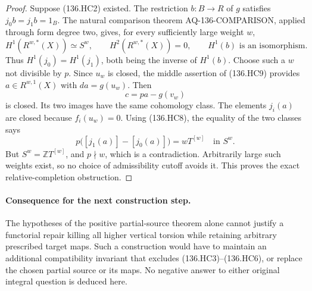 \begin{proof}
Suppose (136.HC2) existed. The restriction $b:B\to R$ of
$g$ satisfies $j_0b=j_1b=1_B$. The natural comparison theorem
AQ-136-COMPARISON, applied through form degree two, gives,
for every sufficiently large weight $w$,
\[
 H^1(R^{w,*}(X))\simeq S^w,\qquad
 H^2(R^{w,*}(X))=0,\qquad
 H^1(b)\text{ is an isomorphism}.                         \tag{136.HC9}
\]
Thus $H^1(j_0)=H^1(j_1)$, both being the inverse of $H^1(b)$.
Choose such a $w$ not divisible by $p$. Since $u_w$ is
closed, the middle assertion of (136.HC9) provides
$a\in R^{w,1}(X)$ with $da=g(u_w)$. Then
\[
                           c=pa-g(v_w)
\]
is closed. Its two images have the same cohomology class.
The elements $j_i(a)$ are closed because $f_i(u_w)=0$.
Using (136.HC8), the equality of the two classes says
\[
        p\bigl([j_1(a)]-[j_0(a)]\bigr)=wT^{[w]}
                                      \quad\text{in }S^w.
                                                               \tag{136.HC10}
\]
But $S^w=\mathbb ZT^{[w]}$, and $p\nmid w$, which is a
contradiction. Arbitrarily large such weights exist, so
no choice of admissibility cutoff avoids it.
This proves the exact relative-completion obstruction.
\end{proof}

\paragraph{Consequence for the next construction step.}
The hypotheses of the positive partial-source theorem alone
cannot justify a functorial repair killing all higher
vertical torsion while retaining arbitrary prescribed target
maps. Such a construction would have to maintain an additional
compatibility invariant that excludes (136.HC3)--(136.HC6),
or replace the chosen partial source or its maps. No negative
answer to either original integral question is deduced here.
